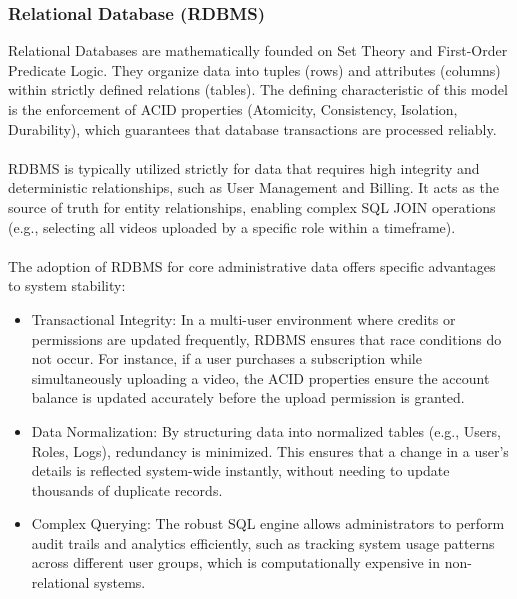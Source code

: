 \subsubsection*{Relational Database (RDBMS)}
Relational Databases are mathematically founded on Set Theory and First-Order Predicate Logic. They organize data into tuples (rows) and attributes (columns) within strictly defined relations (tables). The defining characteristic of this model is the enforcement of ACID properties (Atomicity, Consistency, Isolation, Durability), which guarantees that database transactions are processed reliably.
\\\\RDBMS is typically utilized strictly for data that requires high integrity and deterministic relationships, such as User Management and Billing. It acts as the source of truth for entity relationships, enabling complex SQL JOIN operations (e.g., selecting all videos uploaded by a specific role within a timeframe).\\\\
The adoption of RDBMS for core administrative data offers specific advantages to system stability:
\begin{itemize}
    \item Transactional Integrity: In a multi-user environment where credits or permissions are updated frequently, RDBMS ensures that race conditions do not occur. For instance, if a user purchases a subscription while simultaneously uploading a video, the ACID properties ensure the account balance is updated accurately before the upload permission is granted.
    \item Data Normalization: By structuring data into normalized tables (e.g., Users, Roles, Logs), redundancy is minimized. This ensures that a change in a user's details is reflected system-wide instantly, without needing to update thousands of duplicate records.
    \item Complex Querying: The robust SQL engine allows administrators to perform audit trails and analytics efficiently, such as tracking system usage patterns across different user groups, which is computationally expensive in non-relational systems.
\end{itemize}

